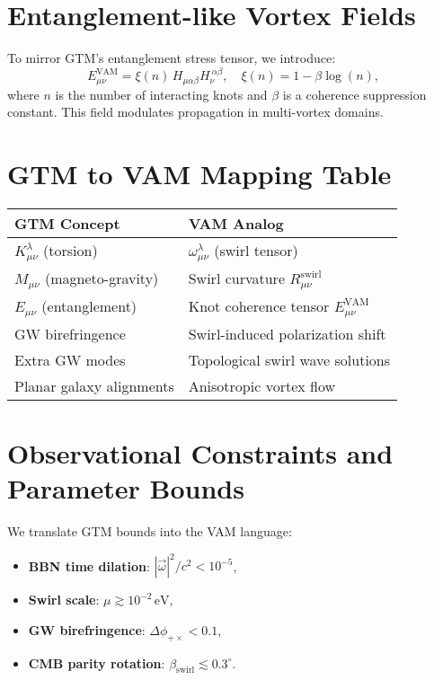 \documentclass[11pt]{article}
\begin{document}
        \section{Entanglement-like Vortex Fields}

        To mirror GTM’s entanglement stress tensor, we introduce:
        \[
            E_{\mu\nu}^{\text{VAM}} = \xi(n) \, H_{\mu\alpha\beta} H_\nu^{\ \alpha\beta},
            \quad \xi(n) = 1 - \beta \log(n),
        \]
        where \( n \) is the number of interacting knots and \( \beta \) is a coherence suppression constant. This field modulates propagation in multi-vortex domains.

        \section{GTM to VAM Mapping Table}

        \begin{center}
            \begin{tabular}{|l|l|}
                \hline
                \textbf{GTM Concept} & \textbf{VAM Analog} \\
                \hline
                \( K^\lambda_{\mu\nu} \) (torsion) & \( \omega^\lambda_{\mu\nu} \) (swirl tensor) \\
                \( M_{\mu\nu} \) (magneto-gravity) & Swirl curvature \( R^\text{swirl}_{\mu\nu} \) \\
                \( E_{\mu\nu} \) (entanglement) & Knot coherence tensor \( E_{\mu\nu}^{\text{VAM}} \) \\
                GW birefringence & Swirl-induced polarization shift \\
                Extra GW modes & Topological swirl wave solutions \\
                Planar galaxy alignments & Anisotropic vortex flow \\
                \hline
            \end{tabular}
        \end{center}

        \section{Observational Constraints and Parameter Bounds}

        We translate GTM bounds into the VAM language:
        \begin{itemize}
            \item \textbf{BBN time dilation}: \( |\vec{\omega}|^2 / c^2 < 10^{-5} \),
            \item \textbf{Swirl scale}: \( \mu \gtrsim 10^{-2} \,\text{eV} \),
            \item \textbf{GW birefringence}: \( \Delta\phi_{+\times} < 0.1 \),
            \item \textbf{CMB parity rotation}: \( \beta_\text{swirl} \lesssim 0.3^\circ \).
        \end{itemize}
\end{document}
